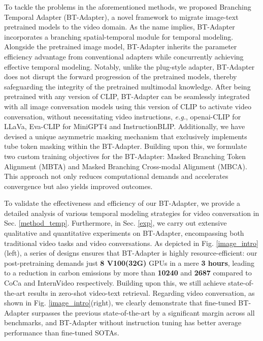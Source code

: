 \documentclass{article} \usepackage{iclr2024_conference,times}
\begin{document}
To tackle the problems in the aforementioned methods, we proposed Branching Temporal Adapter (BT-Adapter), a novel framework to migrate image-text pretrained models to the video domain. As the name implies, BT-Adapter incorporates a branching spatial-temporal module for temporal modeling. Alongside the pretrained image model, BT-Adapter inherits the parameter efficiency advantage from conventional adapters \citep{houlsby2019parameter} while concurrently achieving effective temporal modeling. Notably, unlike the plug-style adapter, BT-Adapter does not disrupt the forward progression of the pretrained models, thereby safeguarding the integrity of the pretrained multimodal knowledge. After being pretrained with any version of CLIP, BT-Adapter can be seamlessly integrated with all image conversation models using this version of CLIP to activate video conversation, without necessitating video instructions, \textit{e.g.}, openai-CLIP for LLaVa, Eva-CLIP for MiniGPT4 and InstructionBLIP. Additionally, we have devised a unique asymmetric masking mechanism that exclusively implements tube token masking within the BT-Adapter. Building upon this, we formulate two custom training objectives for the BT-Adapter: Masked Branching Token Alignment (MBTA) and Masked Branching Cross-modal Alignment (MBCA). This approach not only reduces computational demands and accelerates convergence but also yields improved outcomes.

To validate the effectiveness and efficiency of our BT-Adapter, we provide a detailed analysis of various temporal modeling strategies for video conversation in Sec. \ref{method_temp}. Furthermore, in Sec. \ref{exp}, we carry out extensive qualitative and quantitative experiments on BT-Adapter, encompassing both traditional video tasks and video conversations.
As depicted in Fig. \ref{image_intro}(left), a series of designs ensures that BT-Adapter is highly resource-efficient: our post-pretraining demands just \textbf{8 V100(32G)} GPUs in a mere \textbf{3 hours}, leading to a reduction in carbon emissions by more than \textbf{10240} and \textbf{2687} compared to CoCa \citep{yu2022coca} and InternVideo \citep{wang2022internvideo} respectively. Building upon this, we still achieve state-of-the-art results in zero-shot video-text retrieval. Regarding video conversation, as shown in Fig. \ref{image_intro}(right), we clearly demonstrate that fine-tuned BT-Adapter surpasses the previous state-of-the-art by a significant margin across all benchmarks, and BT-Adapter without instruction tuning has better average performance than fine-tuned SOTAs. 
\end{document}
